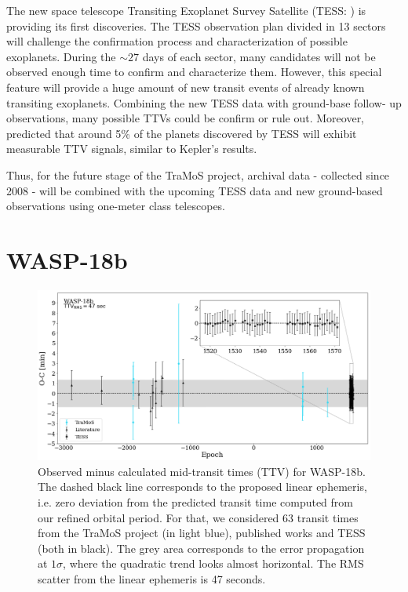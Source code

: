 The new space telescope Transiting Exoplanet Survey Satellite (TESS: \cite{Ricker2014}) is providing its first discoveries. The TESS observation plan divided in 13 sectors will challenge the confirmation process and characterization of possible exoplanets. During the $\sim27$ days of each sector, many candidates will not be observed enough time to confirm and characterize them. However, this special feature will provide a huge amount of new transit events of already known transiting exoplanets. Combining the new TESS data with ground-base follow- up observations, many possible TTVs could be confirm or rule out. Moreover, \cite{Ballard2018} predicted that around 5\% of the planets discovered by TESS will exhibit measurable TTV signals, similar to Kepler’s results.

Thus, for the future stage of the TraMoS project, archival data - collected since 2008 - will be combined with the upcoming TESS data and new ground-based observations using one-meter class telescopes. 


\section{WASP-18b}

\begin{figure}[H]
\includegraphics[width=1.0\textwidth]{imagenes/WASP18_TTV.png}
\caption{Observed minus calculated mid-transit times (TTV) for WASP-18b. The dashed black line corresponds to the proposed linear ephemeris, i.e. zero deviation from the predicted transit time  computed from our refined orbital period. For that, we considered 63 transit times from the TraMoS project (in light blue), published works and TESS (both in black). The grey area corresponds to the error propagation at $1\sigma$, where the quadratic trend looks almost horizontal.  The RMS scatter from the linear ephemeris is 47 seconds.}
\label{wasp18_ttv}
\end{figure}

